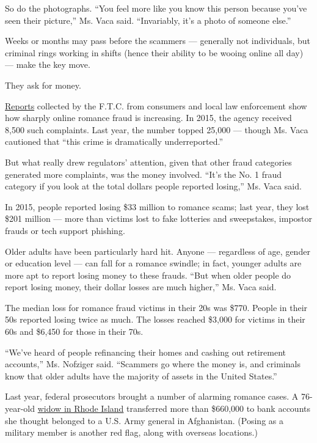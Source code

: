 So do the photographs. ``You feel more like you know this person because
you've seen their picture,'' Ms. Vaca said. ``Invariably, it's a photo
of someone else.''

Weeks or months may pass before the scammers --- generally not
individuals, but criminal rings working in shifts (hence their ability
to be wooing online all day) --- make the key move.

They ask for money.

\href{https://www.ftc.gov/reports/consumer-sentinel-network-data-book-2019}{Reports}
collected by the F.T.C. from consumers and local law enforcement show
how sharply online romance fraud is increasing. In 2015, the agency
received 8,500 such complaints. Last year, the number topped 25,000 ---
though Ms. Vaca cautioned that ``this crime is dramatically
underreported.''

But what really drew regulators' attention, given that other fraud
categories generated more complaints, was the money involved. ``It's the
No. 1 fraud category if you look at the total dollars people reported
losing,'' Ms. Vaca said.

In 2015, people reported losing \$33 million to romance scams; last
year, they lost \$201 million --- more than victims lost to fake
lotteries and sweepstakes, impostor frauds or tech support phishing.

Older adults have been particularly hard hit. Anyone --- regardless of
age, gender or education level --- can fall for a romance swindle; in
fact, younger adults are more apt to report losing money to these
frauds. ``But when older people do report losing money, their dollar
losses are much higher,'' Ms. Vaca said.

The median loss for romance fraud victims in their 20s was \$770. People
in their 50s reported losing twice as much. The losses reached \$3,000
for victims in their 60s and \$6,450 for those in their 70s.

``We've heard of people refinancing their homes and cashing out
retirement accounts,'' Ms. Nofziger said. ``Scammers go where the money
is, and criminals know that older adults have the majority of assets in
the United States.''

Last year, federal prosecutors brought a number of alarming romance
cases. A 76-year-old
\href{https://www.justice.gov/usao-ri/pr/five-charged-online-romance-scams-targeting-seniors}{widow
in Rhode Island} transferred more than \$660,000 to bank accounts she
thought belonged to a U.S. Army general in Afghanistan. (Posing as a
military member is another red flag, along with overseas locations.)

